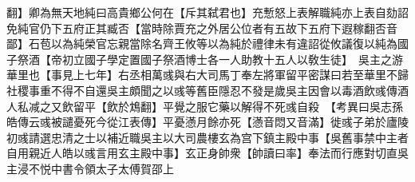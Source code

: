 翻】卿為無天地純曰高貴鄉公何在【斥其弑君也】充慙怒上表解職純亦上表自劾詔免純官仍下五府正其臧否【當時除賈充之外居公位者有五故下五府下遐稼翻否音鄙】石苞以為純榮官忘親當除名齊王攸等以為純於禮律未有違詔從攸議復以純為國子祭酒【帝初立國子學定置國子祭酒博士各一人助教十五人以敎生徒】　吳主之游華里也【事見上七年】右丞相萬彧與右大司馬丁奉左將軍留平密謀曰若至華里不歸社稷事重不得不自還吳主頗聞之以彧等舊臣隱忍不發是歲吳主因會以毒酒飲彧傳酒人私减之又飲留平【飲於鴆翻】平覺之服它藥以解得不死彧自殺　【考異曰吳志孫皓傳云彧被譴憂死今從江表傳】平憂懣月餘亦死【懣音悶又音滿】徙彧子弟於廬陵初彧請選忠清之士以補近職吳主以大司農樓玄為宫下鎮主殿中事【吳舊事禁中主者自用親近人皓以彧言用玄主殿中事】玄正身帥衆【帥讀曰率】奉法而行應對切直吳主浸不悦中書令領太子太傅賀邵上